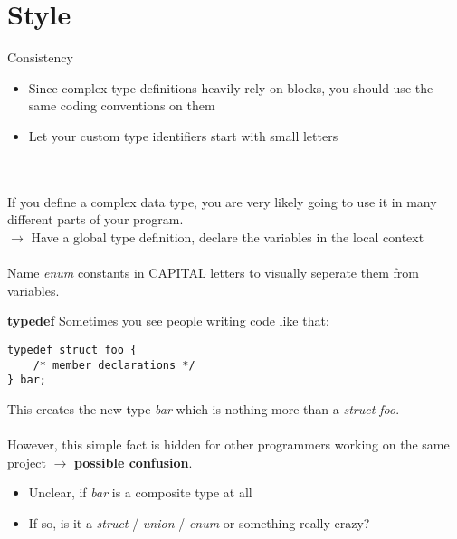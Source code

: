 \section{Style}
\begin{frame}{Consistency}
	\begin{itemize}
		\item Since complex type definitions heavily rely on blocks, you should use the same coding conventions on them
		\item Let your custom type identifiers start with small letters
	\end{itemize} \ \\ \ \\
	If you define a complex data type, you are very likely going to use it in many different parts of your program. \\
	$\rightarrow$ Have a global type definition, declare the variables in the local context \\ \ \\
	Name \textit{enum} constants in CAPITAL letters to visually seperate them from variables.
\end{frame}


\begin{frame}[fragile]{\textbf{typedef}}
	Sometimes you see people writing code like that:
	\begin{lstlisting}[numbers=none]
typedef struct foo {
	/* member declarations */
} bar;
\end{lstlisting}
	This creates the new type \textit{bar} which is nothing more than a \textit{struct foo}. \\ \ \\
	However, this simple fact is hidden for other programmers working on the same project $\rightarrow$ \textbf{possible confusion}.
	\begin{itemize}
		\item Unclear, if \textit{bar} is a composite type at all
		\item If so, is it a \textit{struct} / \textit{union} / \textit{enum} or something really crazy?
	\end{itemize}
\end{frame}



